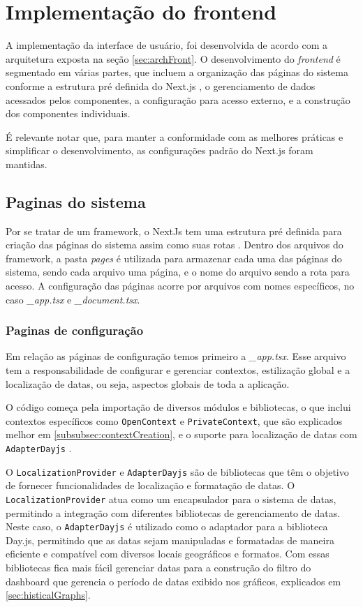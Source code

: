 \section[Implementação do frontend]{Implementação do frontend}\label{sec:implFront}

A implementação da interface de usuário, foi desenvolvida de acordo com a arquitetura exposta na seção \ref{sec:archFront}. O desenvolvimento do \textit{frontend} é segmentado em várias partes, que incluem a organização das páginas do sistema conforme a estrutura pré definida do Next.js \cite{nextjsDocs}, o gerenciamento de dados acessados pelos componentes, a configuração para acesso externo, e a construção dos componentes individuais.

É relevante notar que, para manter a conformidade com as melhores práticas e simplificar o desenvolvimento, as configurações padrão do Next.js foram mantidas.

\subsection{Paginas do sistema}\label{subsec:}
Por se tratar de um framework, o NextJs tem uma estrutura pré definida para criação das páginas do sistema assim como suas rotas \cite{nextjsDefiningRoutes}. Dentro dos arquivos do framework, a pasta \textit{pages} é utilizada para armazenar cada uma das páginas do sistema, sendo cada arquivo uma página, e o nome do arquivo sendo a rota para acesso. A configuração das páginas acorre por arquivos com nomes específicos, no caso \textit{\_app.tsx} e \textit{\_document.tsx}.

\subsubsection{Paginas de configuração}\label{subsec:configPage}
Em relação as páginas de configuração temos primeiro a \textit{\_app.tsx}. Esse arquivo tem a responsabilidade de configurar e gerenciar contextos, estilização global e a localização de datas, ou seja, aspectos globais de toda a aplicação.

O código começa pela importação de diversos módulos e bibliotecas, o que inclui contextos específicos como \texttt{OpenContext} e \texttt{PrivateContext}, que são explicados melhor em \ref{subsubsec:contextCreation}, e o suporte para localização de datas com \texttt{AdapterDayjs} \cite{dayJsInstallation}.

O \texttt{LocalizationProvider} e \texttt{AdapterDayjs} são de bibliotecas que têm o objetivo de fornecer funcionalidades de localização e formatação de datas. O \texttt{LocalizationProvider} atua como um encapsulador para o sistema de datas, permitindo a integração com diferentes bibliotecas de gerenciamento de datas. Neste caso, o \texttt{AdapterDayjs} é utilizado como o adaptador para a biblioteca Day.js, permitindo que as datas sejam manipuladas e formatadas de maneira eficiente e compatível com diversos locais geográficos e formatos. Com essas bibliotecas fica mais fácil gerenciar datas para a construção do filtro do dashboard que gerencia o período de datas exibido nos gráficos, explicados em \ref{sec:histicalGraphs}. 

